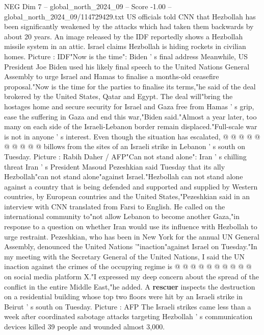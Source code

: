 \begin{textsample}{NEG Dim 7 – global\_north\_2024\_09 – Score -1.00 – global\_north\_2024\_09/114729429.txt}  \label{ex:f7_neg_376}
US officials told CNN that Hezbollah has been significantly weakened by the attacks which had taken them backwards by about 20 years.
An image released by the IDF reportedly shows a Hezbollah missile system in an attic.
Israel claims Hezbollah is hiding rockets in civilian homes.
Picture : IDF"Now is the time": Biden ' s final address Meanwhile, US President Joe Biden used his likely final speech to the United Nations General Assembly to urge Israel and Hamas to finalise a months-old ceasefire proposal."Now is the time for the parties to finalise its terms,"he said of the deal brokered by the United States, Qatar and Egypt.
The deal will"bring the hostages home and secure security for Israel and Gaza free from Hamas ' s grip, ease the suffering in Gaza and end this war,"Biden said."Almost a year later, too many on each side of the Israeli-Lebanon border remain displaced."Full-scale war is not in anyone ' s interest.
Even though the situation has escalated, @ @ @ @ @ @ @ @ @ @ billows from the sites of an Israeli strike in Lebanon ' s south on Tuesday.
Picture : Rabih Daher / AFP"Can not stand alone": Iran ' s chilling threat Iran ' s President Masoud Pezeshkian said Tuesday that its ally Hezbollah"can not stand alone"against Israel."Hezbollah can not stand alone against a country that is being defended and supported and supplied by Western countries, by European countries and the United States,"Pezeshkian said in an interview with CNN translated from Farsi to English.
He called on the international community to"not allow Lebanon to become another Gaza,"in response to a question on whether Iran would use its influence with Hezbollah to urge restraint.
Pezeshkian, who has been in New York for the annual UN General Assembly, denounced the United Nations '"inaction"against Israel on Tuesday."In my meeting with the Secretary General of the United Nations, I said the UN inaction against the crimes of the occupying regime is @ @ @ @ @ @ @ @ @ @ on social media platform X."I expressed my deep concern about the spread of the conflict in the entire Middle East,"he added.
A \textbf{rescuer} inspects the destruction on a residential building whose top two floors were hit by an Israeli strike in Beirut ' s south on Tuesday.
Picture : AFP The Israeli strikes came less than a week after coordinated sabotage attacks targeting Hezbollah ' s communication devices killed 39 people and wounded almost 3,000.

\end{textsample}
